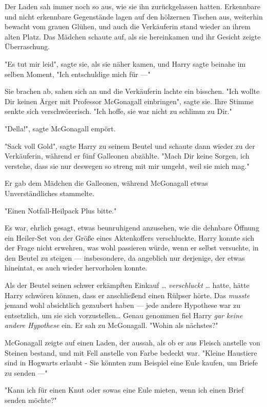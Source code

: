 {\later

Der Laden sah immer noch so aus, wie sie ihn zurückgelassen hatten. Erkennbare und nicht erkennbare Gegenstände lagen auf den hölzernen Tischen aus, weiterhin bewacht vom grauen Glühen, und auch die Verkäuferin stand wieder an ihrem alten Platz. Das Mädchen schaute auf, als sie hereinkamen und ihr Gesicht zeigte Überraschung.

"Es tut mir leid", sagte sie, als sie näher kamen, und Harry sagte beinahe im selben Moment, "Ich entschuldige mich für ---"

Sie brachen ab, sahen sich an und die Verkäuferin lachte ein bisschen. "Ich wollte Dir keinen Ärger mit Professor McGonagall einbringen", sagte sie. Ihre Stimme senkte sich verschwörerisch. "Ich hoffe, sie war nicht zu schlimm zu Dir."

"Della!", sagte McGonagall empört.

"Sack voll Gold", sagte Harry zu seinem Beutel und schaute dann wieder zu der Verkäuferin, während er fünf Galleonen abzählte. "Mach Dir keine Sorgen, ich verstehe, dass sie nur deswegen so streng mit mir umgeht, weil sie mich mag."

Er gab dem Mädchen die Galleonen, während McGonagall etwas Unverständliches stammelte.

"Einen Notfall-Heilpack Plus bitte."

Es war, ehrlich gesagt, etwas beunruhigend anzusehen, wie die dehnbare Öffnung ein Heiler-Set von der Größe eines Aktenkoffers verschluckte. Harry konnte sich der Frage nicht erwehren, was wohl passieren würde, wenn er selbst versuchte, in den Beutel zu steigen --- insbesondere, da angeblich nur derjenige, der etwas hineintat, es auch wieder hervorholen konnte.

Als der Beutel seinen schwer erkämpften Einkauf … \emph{verschluckt} … hatte, hätte Harry schwören können, dass er anschließend einen Rülpser hörte. Das \emph{musste} jemand wohl absichtlich gezaubert haben --- jede andere Hypothese war zu entsetzlich, um sie sich vorzustellen… Genau genommen fiel Harry \emph{gar keine andere Hypothese} ein. Er sah zu McGonagall. "Wohin als nächstes?"

McGonagall zeigte auf einen Laden, der aussah, als ob er aus Fleisch anstelle von Steinen bestand, und mit Fell anstelle von Farbe bedeckt war. "Kleine Haustiere sind in Hogwarts erlaubt - Sie könnten zum Beispiel eine Eule kaufen, um Briefe zu senden ---"

"Kann ich für einen Knut oder sowas eine Eule mieten, wenn ich einen Brief senden möchte?"

}
